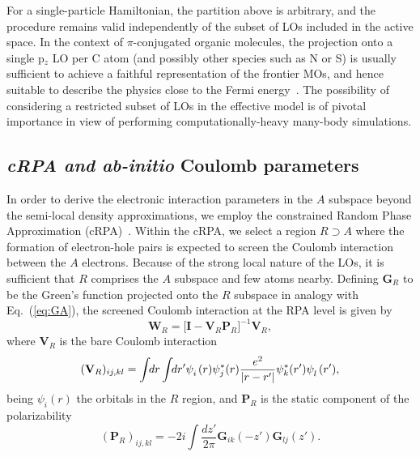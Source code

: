 \documentclass[aps,prx,twocolumn,superscriptaddress]{revtex4-2}
\begin{document}
For a single-particle Hamiltonian, the partition above is arbitrary, and the procedure remains valid independently of the subset of LOs included in the active space. In the context of $\pi$-conjugated organic molecules, the projection onto a single p$_z$ LO per C atom (and possibly other species such as N or S) is usually sufficient to achieve a faithful representation of the frontier MOs, and hence suitable to describe the physics close to the Fermi energy~\cite{gandusJCP153}. 
The possibility of considering a restricted subset of LOs in the effective model is of pivotal importance in view of performing computationally-heavy many-body simulations.

\subsection{\textit{cRPA and ab-initio} Coulomb parameters}
In order to derive the electronic interaction parameters in the $A$ subspace beyond the %
semi-local density approximations, we employ the %
constrained Random Phase Approximation (cRPA)~\cite{jacob2015towards,miyake2009ab,aryasetiawan2006calculations}. 
Within the cRPA, we select a region $R \supset A$ %
where the formation of electron-hole pairs is expected to screen the Coulomb interaction between the $A$ electrons. Because of the strong local nature of the LOs, it is sufficient that $R$ comprises the $A$ subspace and few atoms nearby. 
Defining $\mathbf{G}_R$ to be the Green's function projected onto the $R$ subspace in analogy with Eq.~(\ref{eq:GA}), the screened Coulomb interaction at the RPA level is given by
\begin{equation} \label{eq:W_R} 
    \mathbf{W}_R = \big[ \mathbf{I}-\mathbf{V}_R\mathbf{P}_R \big] ^{-1}\mathbf{V}_R,
\end{equation}
where $\mathbf{V}_R$ is the bare Coulomb interaction 
\begin{equation}
    (\mathbf{V}_R)_{ij,kl} = \int \!\! dr \int \!\! dr' \psi^{\phantom{\dagger}}_i(r) \psi^{*}_j(r) 
                             \frac{e^2}{\abs{r-r'}} 
                             \psi^{*}_k(r') \psi^{\phantom{\dagger}}_l(r'),
\end{equation}
being $\psi_i(r)$ the orbitals in the $R$ region,
and $\mathbf{P}_R$ is the static component of the polarizability
\begin{equation} \label{eq:P_R}
    (\mathbf{P}_R)_{ij,kl} = -2i \int \frac{dz'}{2\pi} \mathbf{G}_{ik}(-z') \mathbf{G}_{lj}(z').
\end{equation}
\end{document}
